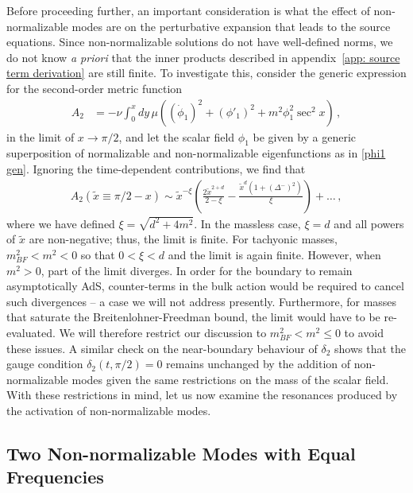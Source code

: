 \documentclass[letterpaper,11pt]{article}
\begin{document}
Before proceeding further, an important consideration is what the effect of non-normalizable modes are on the perturbative expansion that leads to the source equations. Since non-normalizable solutions do not have well-defined norms, we do not know \emph{a priori} that the inner products described in appendix~\ref{app: source term derivation} are still finite. To investigate this, consider the generic expression for the second-order metric function
\begin{align}
A_2 &= - \nu \int^x_0 dy \, \mu \left( (\dot \phi_1)^2 + (\phi'_1)^2 + m^2 \phi_1^2 \sec^2 x \right) \, ,
\end{align}
in the limit of $x \to \pi/2$, and let the scalar field $\phi_1$ be given by a generic superposition of normalizable and non-normalizable eigenfunctions as in \eqref{phi1 gen}. Ignoring the time-dependent contributions, we find that
\begin{align}
A_2 (\tilde x \equiv \pi /2 - x) \sim \tilde{x}^{-\xi} \left( \frac{2 \tilde{x}^{2+d}}{2 - \xi} - \frac{\tilde{x}^d (1 + \left(\Delta^{-}\right)^2)}{\xi} \right) + \ldots \, ,
\end{align}
where we have defined $\xi = \sqrt{d^2 + 4m^2}$. In the massless case, $\xi = d$ and all powers of $\tilde{x}$ are non-negative; thus, the limit is finite. For tachyonic masses, $m^2_{BF} < m^2 < 0$ so that $0 < \xi < d$ and the limit is again finite. However, when $m^2 > 0$, part of the limit diverges. In order for the boundary to remain asymptotically AdS, counter-terms in the bulk action would be required to cancel such divergences -- a case we will not address presently. Furthermore, for masses that saturate the Breitenlohner-Freedman bound, the limit would have to be re-evaluated. We will therefore restrict our discussion to $m^2_{BF} < m^2 \leq 0$ to avoid these issues. A similar check on the near-boundary behaviour of $\delta_2$ shows that the gauge condition ${\delta_2 (t, \pi/2) = 0}$ remains unchanged by the addition of non-normalizable modes given the same restrictions on the mass of the scalar field. With these restrictions in mind, let us now examine the resonances produced by the activation of non-normalizable modes.

\subsection{Two Non-normalizable Modes with Equal Frequencies}
\label{ssec: equalNN}
\end{document}
